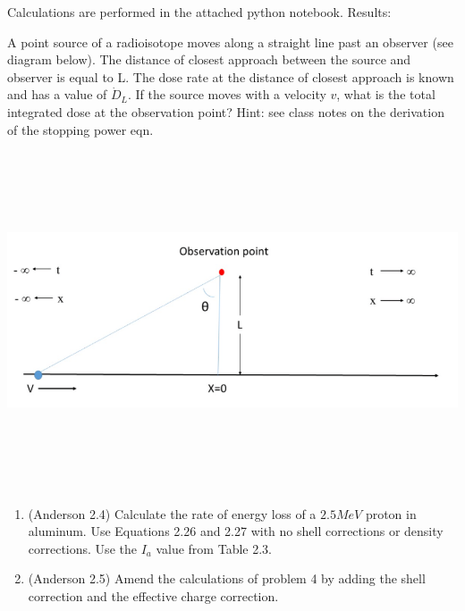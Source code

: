 \documentclass{hw}
\begin{document}
	Calculations are performed in the attached python notebook. Results:



\problem{}
	A point source of a radioisotope moves along a straight line past an observer (see diagram below). The distance of closest approach between the source and observer is equal to L. The dose rate at the distance of closest approach is known and has a value of $ \dot{D}_L $. If the source moves with a velocity $ v $, what is the total integrated dose at the observation point? Hint: see class notes on the derivation of the stopping power eqn.

	\includegraphics[width=15cm,height=10cm,keepaspectratio]{ne551_03_fig_01}

\solution


	\begin{enumerate}
		\item (Anderson 2.4) Calculate the rate of energy loss of a $ 2.5 MeV $ proton in aluminum. Use Equations 2.26 and 2.27 with no shell corrections or density corrections. Use the $ I_a $ value from Table 2.3.
		\item (Anderson 2.5) Amend the calculations of problem 4 by adding the shell correction and the effective charge correction.
	\end{enumerate}

\solution
\end{document}
